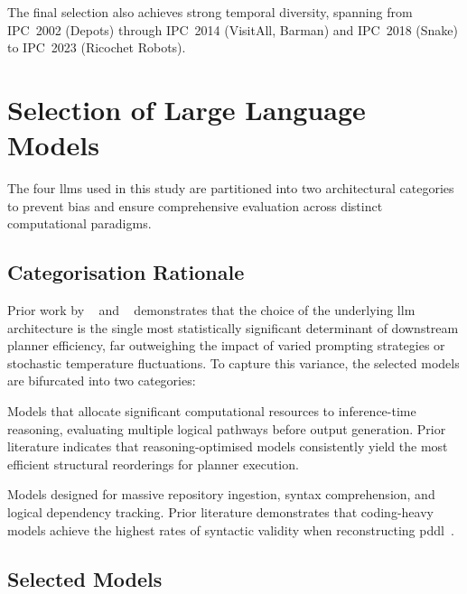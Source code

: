 The final selection also achieves strong temporal diversity, spanning from IPC~2002 (Depots) through IPC~2014 (VisitAll, Barman) and IPC~2018 (Snake) to IPC~2023 (Ricochet Robots).

\section{Selection of Large Language Models}
\label{sec:setup:llms}

The four \glspl{llm} used in this study are partitioned into two architectural categories to prevent bias and ensure comprehensive evaluation across distinct computational paradigms.

\subsection{Categorisation Rationale}

Prior work by \citeauthor{Georgievski2025}~\cite{Georgievski2025} and \citeauthor{Elis2025}~\cite{Elis2025} demonstrates that the choice of the underlying \gls{llm} architecture is the single most statistically significant determinant of downstream planner efficiency, far outweighing the impact of varied prompting strategies or stochastic temperature fluctuations.
To capture this variance, the selected models are bifurcated into two categories:

\begin{description}[style=nextline, leftmargin=1.5cm]
  \item[Category~A --- Deep-Reasoning Architectures:]
    Models that allocate significant computational resources to inference-time reasoning, evaluating multiple logical pathways before output generation.
    Prior literature indicates that reasoning-optimised models consistently yield the most efficient structural reorderings for planner execution.

  \item[Category~B --- Coding Heavyweight Architectures:]
    Models designed for massive repository ingestion, syntax comprehension, and logical dependency tracking.
    Prior literature demonstrates that coding-heavy models achieve the highest rates of syntactic validity when reconstructing \gls{pddl}~\cite{Elis2025, Georgievski2025}.
\end{description}

\subsection{Selected Models}

